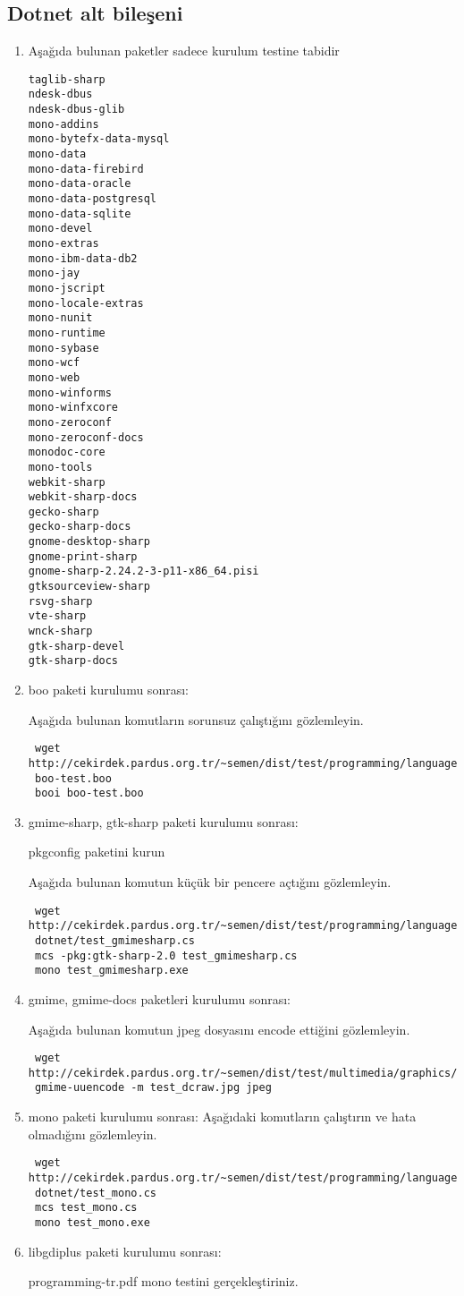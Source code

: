 \documentclass[a4paper,10pt]{article}
\begin{document}
\subsection{Dotnet alt bileşeni}
\begin{enumerate}

\item Aşağıda bulunan paketler sadece kurulum testine tabidir
\begin{verbatim}
taglib-sharp
ndesk-dbus
ndesk-dbus-glib
mono-addins
mono-bytefx-data-mysql
mono-data
mono-data-firebird
mono-data-oracle
mono-data-postgresql
mono-data-sqlite
mono-devel
mono-extras
mono-ibm-data-db2
mono-jay
mono-jscript
mono-locale-extras
mono-nunit
mono-runtime
mono-sybase
mono-wcf
mono-web
mono-winforms
mono-winfxcore
mono-zeroconf
mono-zeroconf-docs
monodoc-core
mono-tools
webkit-sharp
webkit-sharp-docs
gecko-sharp
gecko-sharp-docs
gnome-desktop-sharp
gnome-print-sharp
gnome-sharp-2.24.2-3-p11-x86_64.pisi
gtksourceview-sharp
rsvg-sharp
vte-sharp
wnck-sharp
gtk-sharp-devel
gtk-sharp-docs
\end{verbatim}

\item boo paketi kurulumu sonrası:

Aşağıda bulunan komutların sorunsuz çalıştığını gözlemleyin.
\begin{verbatim}
 wget http://cekirdek.pardus.org.tr/~semen/dist/test/programming/language/dotnet/
 boo-test.boo
 booi boo-test.boo
\end{verbatim}

 \item gmime-sharp, gtk-sharp paketi kurulumu sonrası:

pkgconfig paketini kurun

Aşağıda bulunan komutun küçük bir pencere açtığını gözlemleyin. 
\begin{verbatim}
 wget http://cekirdek.pardus.org.tr/~semen/dist/test/programming/language/
 dotnet/test_gmimesharp.cs
 mcs -pkg:gtk-sharp-2.0 test_gmimesharp.cs
 mono test_gmimesharp.exe
\end{verbatim}


 \item gmime, gmime-docs paketleri kurulumu sonrası:

Aşağıda bulunan komutun jpeg dosyasını encode ettiğini gözlemleyin.
\begin{verbatim}
 wget http://cekirdek.pardus.org.tr/~semen/dist/test/multimedia/graphics/test_dcraw.jpg
 gmime-uuencode -m test_dcraw.jpg jpeg
\end{verbatim}


 \item mono paketi kurulumu sonrası:
Aşağıdaki komutların çalıştırın ve hata olmadığını gözlemleyin.
\begin{verbatim}
 wget http://cekirdek.pardus.org.tr/~semen/dist/test/programming/language/
 dotnet/test_mono.cs
 mcs test_mono.cs
 mono test_mono.exe
\end{verbatim}

\item libgdiplus paketi kurulumu sonrası:

programming-tr.pdf mono testini gerçekleştiriniz.

\end{enumerate}
\end{document}

